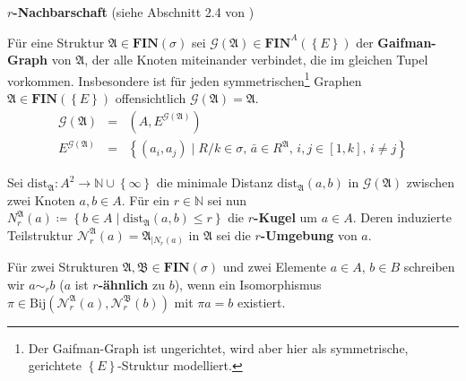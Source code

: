\begin{defn}
\textbf{\label{def:neighborhoods}$r$-Nachbarschaft} (siehe Abschnitt
2.4 von \cite{EbbinghausFlum})

Für eine Struktur $\mathfrak{A}\in\mathbf{FIN}\left(\sigma\right)$
sei $\mathcal{G}\left(\mathfrak{A}\right)\in\mathbf{FIN}^{A}\left(\left\{ E\right\} \right)$
der \textbf{Gaifman-Graph} von $\mathfrak{A}$, der alle Knoten miteinander
verbindet, die im gleichen Tupel vorkommen. Insbesondere ist für jeden
symmetrischen\footnote{Der Gaifman-Graph ist ungerichtet, wird aber hier als symmetrische,
gerichtete $\left\{ E\right\} $-Struktur modelliert.} Graphen $\mathfrak{A}\in\mathbf{FIN}\left(\left\{ E\right\} \right)$
offensichtlich $\mathcal{G}\left(\mathfrak{A}\right)=\mathfrak{A}$.
\begin{eqnarray*}
\mathcal{G}\left(\mathfrak{A}\right) & = & \left(A,E^{\mathcal{G}\left(\mathfrak{A}\right)}\right)\\
E^{\mathcal{G}\left(\mathfrak{A}\right)} & = & \left\{ \left(a_{i},a_{j}\right)\mid R/k\in\sigma,\,\bar{a}\in R^{\mathfrak{A}},\,i,j\in\left[1,k\right],\,i\neq j\right\} 
\end{eqnarray*}

Sei $\mathrm{dist}_{\mathfrak{A}}:A^{2}\rightarrow\mathbb{N\cup\left\{ \infty\right\} }$
die minimale Distanz $\mathrm{dist}_{\mathfrak{A}}\left(a,b\right)$
in $\mathcal{G}\left(\mathfrak{A}\right)$ zwischen zwei Knoten $a,b\in A$.
Für ein $r\in\mathbb{N}$ sei nun $N_{r}^{\mathfrak{A}}\left(a\right)\coloneqq\left\{ b\in A\mid\mathrm{dist}_{\mathfrak{A}}\left(a,b\right)\leqslant r\right\} $
die \textbf{$r$-Kugel} um $a\in A$. Deren induzierte Teilstruktur
$\mathcal{N}_{r}^{\mathfrak{A}}\left(a\right)=\mathfrak{A}_{\mid N_{r}\left(a\right)}$
in $\mathfrak{A}$ sei die \textbf{$r$-Umgebung} von $a$.

Für zwei Strukturen $\mathfrak{A},\mathfrak{B}\in\mathbf{FIN}\left(\sigma\right)$
und zwei Elemente $a\in A$, $b\in B$ schreiben wir $a\sim_{r}b$
($a$ ist \textbf{$r$-ähnlich} zu $b$), wenn ein Isomorphismus $\pi\in\mathrm{Bij}\left(\mathcal{N}_{r}^{\mathfrak{A}}\left(a\right),\mathcal{N}_{r}^{\mathfrak{B}}\left(b\right)\right)$
mit $\pi a=b$ existiert.
\end{defn}
%
